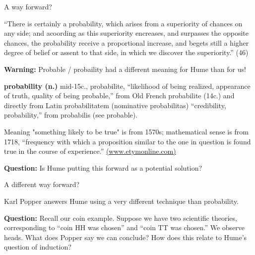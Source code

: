 \documentclass[8pt]{beamer}\usepackage[]{graphicx}\usepackage[]{color}
\begin{document}


\begin{frame}{A way forward?}

\begin{addmargin}[2em]{2em}%
    ``There is certainly a probability, which arises from a superiority
    of chances on any side; and acoording as this superiority encreases,
    and surpasses the opposite chances, the probability receive a proportional
    increase, and begets still a higher degree of belief or assent to that side,
    in which we discover the superiority.'' (46)
\end{addmargin}

\pause
\textbf{Warning:}
Probable / probaility had a different meaning for Hume than for us!

\textbf{probability (n.)} mid-15c., probabilite, ``likelihood of being realized,
appearance of truth, quality of being probable,'' from Old French probabilite
(14c.) and directly from Latin probabilitatem (nominative probabilitas)
``credibility, probability,'' from probabilis (see probable).

Meaning "something likely to be true" is from 1570s; mathematical sense is from
1718, ``frequency with which a proposition similar to the one in question is
found true in the course of experience.''
\href{https://www.etymonline.com/word/probability}{(www.etymonline.com)}

\pause

\textbf{Question:} Is Hume putting this forward as a potential solution?

\end{frame}


\begin{frame}{A different way forward?}

Karl Popper answers Hume using a very different technique than
probability.

\setminipage{}

\textbf{Question:} Recall our coin example.  Suppose we have two
scientific theories, corresponding to ``coin HH was chosen''
and ``coin TT was chosen.''  We observe heads.  What does Popper
say we can conclude?  How does this relate to Hume's question of
induction?


\end{frame}
\end{document}
